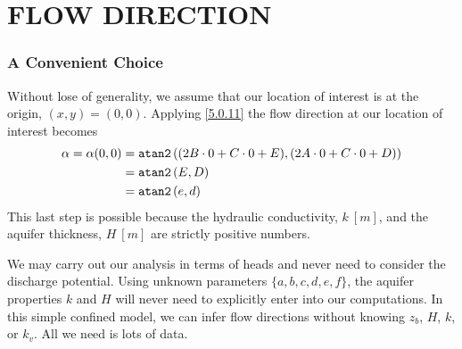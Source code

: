 \documentclass[12pt]{report}
\begin{document}
\chapter{FLOW DIRECTION}
\subsection{A Convenient Choice}
Without lose of generality, we assume that our location of interest is at the origin, $(x,y) = (0,0)$.  Applying \eqref{5.0.11} the flow direction at our location of interest becomes
%
\begin{align}\label{8.0.1}
    \alpha = \alpha(0,0)
    &= \text{\tt atan2}\left((2B \cdot 0 + C \cdot 0 + E), (2A \cdot 0 + C \cdot 0 + D)\right) \nonumber\\
    &= \text{\tt atan2}\left(E, D\right) \nonumber\\
    &= \text{\tt atan2}\left(e, d\right)
\end{align}
%
This last step is possible because the hydraulic conductivity, $k~[m]$, and the aquifer thickness, $H~[m]$ are strictly positive numbers.

We may carry out our analysis in terms of heads and never need to consider the discharge potential.  Using unknown parameters $\{a, b, c, d, e, f \}$, the aquifer properties $k$ and $H$ will never need to explicitly enter into our computations.  In this simple confined model, we can infer flow directions without knowing $z_b$, $H$, $k$, or $k_v$. All we need is lots of data.

\end{document}
